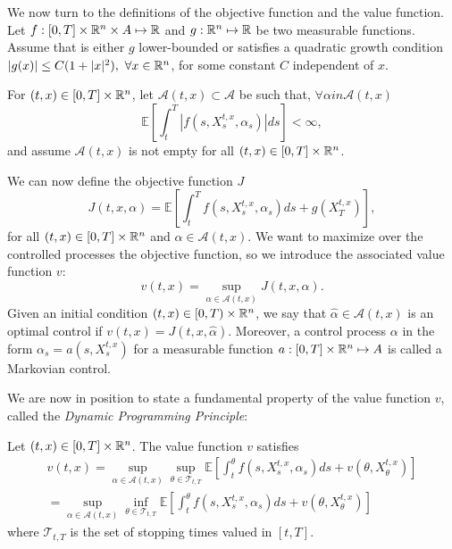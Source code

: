We now turn to the definitions of the objective function and the value function.
Let $ f: [0,T] \times \mathbb{R}^n \times A \mapsto \mathbb{R} $ and $ g: \mathbb{R}^n \mapsto \mathbb{R} $
be two measurable functions. Assume that is either $g$ lower-bounded or 
satisfies a quadratic growth condition 
$| g(x) | \leq C(1 + |x|^2),\ \forall x \in \mathbb{R}^n$, for some constant $C$
independent of $x$.

For $(t,x) \in [0,T] \times \mathbb{R}^n$, let $\mathcal{A}(t,x) \subset \mathcal{A}$
be such that, $\forall \alpha in \mathcal{A}(t,x)$
\begin{equation}
    \mathbb{E}\left[ \int_t^T | f(s, X_s^{t,x}, \alpha_s) | ds \right] < \infty,
\end{equation}
and assume $\mathcal{A}(t,x)$ is not empty for all
$(t,x) \in [0,T] \times \mathbb{R}^n$.

We can now define the objective function $J$
\begin{equation}
    J(t, x, \alpha) = \mathbb{E}\left[ \int_t^T f(s, X_s^{t,x}, \alpha_s) ds + g(X^{t,x}_T) \right],
\end{equation}
for all $(t,x) \in [0,T] \times \mathbb{R}^n$ and $\alpha \in \mathcal{A}(t,x)$.
We want to maximize over the controlled processes the objective function, so
we introduce the associated value function $v$:
\begin{equation}
    v(t,x) = \sup_{\alpha \in \mathcal{A}(t,x)} J(t,x,\alpha).
\end{equation}
Given an initial condition $(t,x) \in \left[ 0,T \right) \times \mathbb{R}^n$, we say
that $\hat \alpha \in \mathcal{A}(t,x)$ is an optimal control if
$v(t,x) = J(t,x,\hat \alpha)$.
Moreover, a control process $\alpha$ in the form $\alpha_s = a(s,X_s^{t,x})$ for
a measurable function $a: [0,T] \times \mathbb{R}^n \mapsto A$ is
called a Markovian control.

We are now in position to state a fundamental property of the value function $v$,
called the \textit{Dynamic Programming Principle}:

\begin{theorem}
    Let $(t,x) \in [0,T] \times \mathbb{R}^n$. The value function $v$ satisfies
\begin{gather} 
        v(t,x) = \sup_{\alpha \in \mathcal{A}(t,x)}
        \sup_{\theta \in \mathcal{T}_{t,T}}
        \mathbb{E}\left[ \int_t^\theta f(s, X_s^{t,x}, \alpha_s) ds + v(\theta, X^{t,x}_\theta) \right]\\
        =\sup_{\alpha \in \mathcal{A}(t,x)}
        \inf_{\theta \in \mathcal{T}_{t,T}}
        \mathbb{E}\left[ \int_t^\theta f(s, X_s^{t,x}, \alpha_s) ds + v(\theta, X^{t,x}_\theta) \right]
\end{gather}
    where $\mathcal{T}_{t, T}$ is the set of stopping times valued in $[t,T]$.
\end{theorem}

